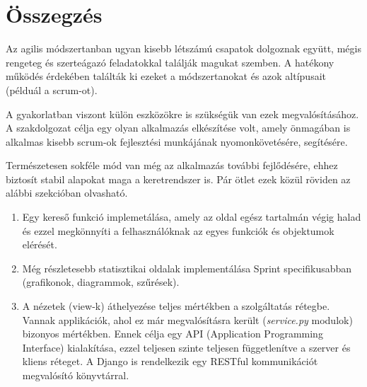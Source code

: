 \chapter{Összegzés} %
\label{ch:sum}

Az agilis módszertanban ugyan kisebb létszámú csapatok dolgoznak együtt, mégis rengeteg és szerteágazó feladatokkal találják magukat szemben. A hatékony működés érdekében találták ki ezeket a módszertanokat és azok altípusait (példuál a scrum-ot). 

A gyakorlatban viszont külön eszközökre is szükségük van ezek megvalósításához. A szakdolgozat célja egy olyan alkalmazás elkészítése volt, amely önmagában is alkalmas kisebb scrum-ok fejlesztési munkájának nyomonkövetésére, segítésére. 

Természetesen sokféle mód van még az alkalmazás további fejlődésére, ehhez biztosít stabil alapokat maga a keretrendszer is. Pár ötlet ezek közül röviden az alábbi szekcióban olvasható.

\begin{enumerate}
    \item Egy kereső funkció implemetálása, amely az oldal egész tartalmán végig halad és ezzel megkönnyíti a felhasználóknak az egyes funkciók és objektumok elérését.
    \item Még részletesebb statisztikai oldalak implementálása Sprint specifikusabban (grafikonok, diagrammok, szűrések).
    \item A nézetek (view-k) áthelyezése teljes mértékben a szolgáltatás rétegbe. Vannak applikációk, ahol ez már megvalósításra került (\textit{service.py} modulok) bizonyos mértékben. Ennek célja egy API (Application Programming Interface) kialakítása, ezzel teljesen szinte teljesen függetlenítve a szerver és kliens réteget.
    A Django is rendelkezik egy RESTful kommunikációt megvalósító könyvtárral.
\end{enumerate}





